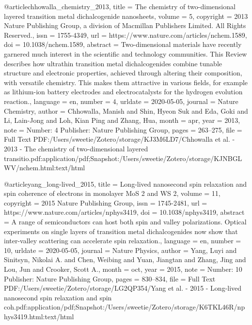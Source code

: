 {@article{chhowalla_chemistry_2013,
	title = {The chemistry of two-dimensional layered transition metal dichalcogenide nanosheets},
	volume = {5},
	copyright = {2013 Nature Publishing Group, a division of Macmillan Publishers Limited. All Rights Reserved.},
	issn = {1755-4349},
	url = {https://www.nature.com/articles/nchem.1589},
	doi = {10.1038/nchem.1589},
	abstract = {Two-dimensional materials have recently garnered much interest in the scientific and technology communities. This Review describes how ultrathin transition metal dichalcogenides combine tunable structure and electronic properties, achieved through altering their composition, with versatile chemistry. This makes them attractive in various fields, for example as lithium-ion battery electrodes and electrocatalysts for the hydrogen evolution reaction.},
	language = {en},
	number = {4},
	urldate = {2020-05-05},
	journal = {Nature Chemistry},
	author = {Chhowalla, Manish and Shin, Hyeon Suk and Eda, Goki and Li, Lain-Jong and Loh, Kian Ping and Zhang, Hua},
	month = apr,
	year = {2013},
	note = {Number: 4
Publisher: Nature Publishing Group},
	pages = {263--275},
	file = {Full Text PDF:/Users/sweetie/Zotero/storage/KJ3M6LD7/Chhowalla et al. - 2013 - The chemistry of two-dimensional layered transitio.pdf:application/pdf;Snapshot:/Users/sweetie/Zotero/storage/KJNBGLWV/nchem.html:text/html}
}

@article{yang_long-lived_2015,
	title = {Long-lived nanosecond spin relaxation and spin coherence of electrons in monolayer {MoS} 2 and {WS} 2},
	volume = {11},
	copyright = {2015 Nature Publishing Group},
	issn = {1745-2481},
	url = {https://www.nature.com/articles/nphys3419},
	doi = {10.1038/nphys3419},
	abstract = {A range of semiconductors can host both spin and valley polarizations. Optical experiments on single layers of transition metal dichalcogenides now show that inter-valley scattering can accelerate spin relaxation.},
	language = {en},
	number = {10},
	urldate = {2020-05-05},
	journal = {Nature Physics},
	author = {Yang, Luyi and Sinitsyn, Nikolai A. and Chen, Weibing and Yuan, Jiangtan and Zhang, Jing and Lou, Jun and Crooker, Scott A.},
	month = oct,
	year = {2015},
	note = {Number: 10
Publisher: Nature Publishing Group},
	pages = {830--834},
	file = {Full Text PDF:/Users/sweetie/Zotero/storage/LG2QP354/Yang et al. - 2015 - Long-lived nanosecond spin relaxation and spin coh.pdf:application/pdf;Snapshot:/Users/sweetie/Zotero/storage/K6TKL46R/nphys3419.html:text/html}
}


}
